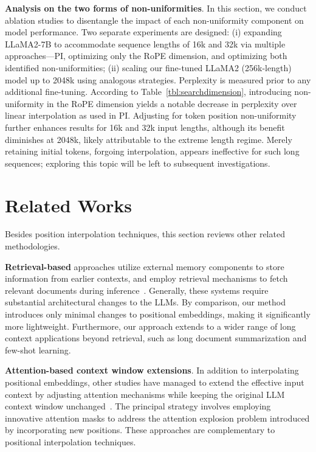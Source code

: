 \textbf{Analysis on the two forms of non-uniformities}. In this section, we conduct ablation studies to disentangle the impact of each non-uniformity component on model performance. Two separate experiments are designed: (i) expanding LLaMA2-7B to accommodate sequence lengths of 16k and 32k via multiple approaches—PI, optimizing only the RoPE dimension, and optimizing both identified non-uniformities; (ii) scaling our fine-tuned LLaMA2 (256k-length) model up to 2048k using analogous strategies. Perplexity is measured prior to any additional fine-tuning. According to Table~\ref{tbl:searchdimension}, introducing non-uniformity in the RoPE dimension yields a notable decrease in perplexity over linear interpolation as used in PI. Adjusting for token position non-uniformity further enhances results for 16k and 32k input lengths, although its benefit diminishes at 2048k, likely attributable to the extreme length regime. Merely retaining initial tokens, forgoing interpolation, appears ineffective for such long sequences; exploring this topic will be left to subsequent investigations.

\section{Related Works}

Besides position interpolation techniques, this section reviews other related methodologies.

\textbf{Retrieval-based} approaches utilize external memory components to store information from earlier contexts, and employ retrieval mechanisms to fetch relevant documents during inference~\cite{longllama,wang2023augmenting,borgeaud2022improving}. Generally, these systems require substantial architectural changes to the LLMs. By comparison, our method introduces only minimal changes to positional embeddings, making it significantly more lightweight. Furthermore, our approach extends to a wider range of long context applications beyond retrieval, such as long document summarization and few-shot learning.

\textbf{Attention-based context window extensions}. In addition to interpolating positional embeddings, other studies have managed to extend the effective input context by adjusting attention mechanisms while keeping the original LLM context window unchanged~\cite{han2023lminfinite, streamingllm,parallelwindow}. The principal strategy involves employing innovative attention masks to address the attention explosion problem introduced by incorporating new positions. These approaches are complementary to positional interpolation techniques.

